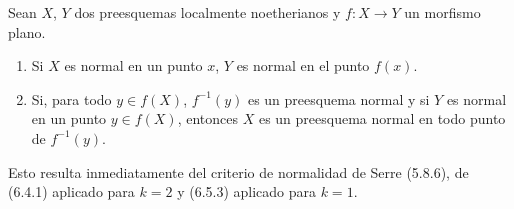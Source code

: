 \begin{corollary}[6.5.4]
\label{IV.2.s6.5.4-fr}
Sean $X$, $Y$ dos preesquemas localmente noetherianos y $f:X\to Y$
un morfismo plano.
\begin{enumerate}
\item[\textup{(i)}] Si $X$ es normal en un punto $x$, $Y$ es normal en el punto
$f(x)$.
\item[\textup{(ii)}] Si, para todo $y\in f(X)$, $f^{-1}(y)$ es un preesquema
normal y si $Y$ es normal en un punto $y\in f(X)$, entonces $X$ es un
preesquema normal en todo punto de $f^{-1}(y)$.
\end{enumerate}
\end{corollary}

Esto resulta inmediatamente del criterio de normalidad de Serre (5.8.6), de
(6.4.1) aplicado para $k=2$ y (6.5.3) aplicado para $k=1$.


